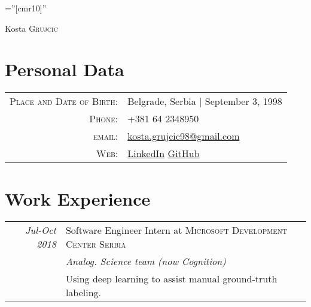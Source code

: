 \documentclass[a4paper,10pt]{article}
\begin{document}

\pagestyle{empty} %

\font\fb=''[cmr10]'' %

\par{\centering
		{\Huge Kosta \textsc{Grujcic}
	}\bigskip\par}

\section{Personal Data}

\begin{tabular}{rl}
    \textsc{Place and Date of Birth:} & Belgrade, Serbia  | September 3, 1998 \\
    \textsc{Phone:}     & +381 64 2348950\\
    \textsc{email:}     & \href{mailto:kosta.grujcic98@gmail.com}{kosta.grujcic98@gmail.com} \\
    \textsc{Web:}  & \href{https://www.linkedin.com/in/kosta-grujcic-022b01167}{LinkedIn} \href{https://github.com/4eyes4u/}{GitHub}
\end{tabular}

\section{Work Experience}
\begin{tabular}{r|p{11cm}}
 \emph{Jul-Oct 2018} & Software Engineer Intern at \textsc{Microsoft Development Center Serbia} \\\textsc{}&\emph{Analog. Science team (now Cognition)}\\&\footnotesize{Using deep learning to assist manual ground-truth labeling.}
\end{tabular}

\end{document}
